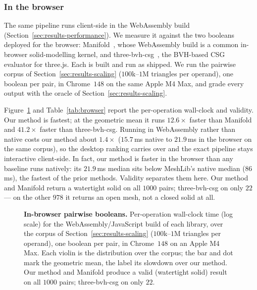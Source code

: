 \documentclass{egpubl}
\begin{document}
\begin{table}[t]
\centering
\caption{$N$-ary boolean: median wall-clock and validity per operand count $N$, over $40$ random Thingi10K $N$-operand sets per $N$. Validity counts, out of the $40$ per $N$, the sets the oracle of Section~\ref{sec:results-scaling} grades valid; a set that times out or errors counts invalid. CGAL is excluded: it accumulates pairwise, like MeshLib, but is too slow to complete the sweep within the cap.}
\label{tab:nary}
\small

\end{table}

\subsubsection{In the browser}
\label{sec:results-browser}

The same pipeline runs client-side in the WebAssembly build (Section~\ref{sec:results-performance}). We measure it against the two booleans deployed for the browser: Manifold~\cite{Manifold}, whose WebAssembly build is a common in-browser solid-modelling kernel, and three-bvh-csg~\cite{ThreeBvhCsg}, the BVH-based CSG evaluator for three.js. Each is built and run as shipped. We run the pairwise corpus of Section~\ref{sec:results-scaling} ($100$k--$1$M triangles per operand), one boolean per pair, in Chrome~$148$ on the same Apple M4 Max, and grade every output with the oracle of Section~\ref{sec:results-scaling}.

Figure~\ref{fig:comparison-browser} and Table~\ref{tab:browser} report the per-operation wall-clock and validity. Our method is fastest; at the geometric mean it runs $12.6\times$ faster than Manifold and $41.2\times$ faster than three-bvh-csg. Running in WebAssembly rather than native costs our method about $1.4\times$ ($15.7$\,ms native to $21.9$\,ms in the browser on the same corpus), so the desktop ranking carries over and the exact pipeline stays interactive client-side. In fact, our method is faster in the browser than any baseline runs natively: its $21.9$\,ms median sits below MeshLib's native median ($86$\,ms), the fastest of the prior methods. Validity separates them here. Our method and Manifold return a watertight solid on all $1000$ pairs; three-bvh-csg on only $22$ --- on the other $978$ it returns an open mesh, not a closed solid at all.

\begin{figure}[t]
  \centering
  
  \caption{\textbf{In-browser pairwise booleans.} Per-operation wall-clock time (log scale) for the WebAssembly/JavaScript build of each library, over the corpus of Section~\ref{sec:results-scaling} ($100$k--$1$M triangles per operand), one boolean per pair, in Chrome~$148$ on an Apple M4 Max. Each violin is the distribution over the corpus; the bar and dot mark the geometric mean, the label its slowdown over our method. Our method and Manifold produce a valid (watertight solid) result on all $1000$ pairs; three-bvh-csg on only $22$.}
  \label{fig:comparison-browser}
\end{figure}
\end{document}
